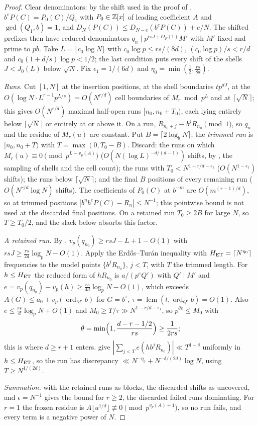 \documentclass[11pt]{article}
\newcommand{\fr}[1]{\{#1\}}
\DeclareMathOperator{\ord}{ord}
\DeclareMathOperator{\lcm}{lcm}
\begin{document}
\begin{proof}
Clear denominators: by the shift used in the proof of , $b^eP(C)=P_0(C)/Q_1$ with
$P_0\in\mathbb Z[x]$ of leading coefficient $A$ and $\gcd(Q_1,b)=1$, and $D_N(P(C))\le D_{N-e}(b^eP(C))+e/N$. The
shifted prefixes then have reduced denominators $q_n\mid p^{rsJ+O_P(1)}M'$ with $M'$ fixed and prime to $pb$.
Take $L=\lfloor c_0\log N\rfloor$ with $c_0\log p\le rs/(8d)$, $(c_0\log p)/s<r/d$ and
$c_0(1+d/s)\log p<1/2$; the last condition puts every shift of the shells $J<J_0(L)$ below $\sqrt N$. Fix
$\epsilon_1=1/(6d)$ and $\eta_0=\min(\frac12,\frac{rs}{8d})$.

\emph{Runs.} Cut $[1,N]$ at the insertion positions, at the shell boundaries $tp^{dJ}$, at the
$O(\log N\cdot L^{r-1}p^{L/s})=O(N^{r/d})$ cell boundaries of $M_r\bmod p^L$ and at $\lceil\sqrt N\rceil$; this
gives $O(N^{r/d})$ maximal half-open runs $[n_0,n_0+T_0)$, each lying entirely below $\lceil\sqrt N\rceil$ or
entirely at or above it. On a run, $R_{n_0+j}\equiv b^jR_{n_0}\pmod1$, so $q_n$ and the residue of $M_r(u)$ are
constant. Put $B=\lceil2\log_bN\rceil$; the \emph{trimmed run} is $[n_0,n_0+T)$ with $T=\max(0,T_0-B)$. Discard:
the runs on which $M_r(u)\equiv0\pmod{p^{L-v_p(A)}}$ ($O(N(\log L)^{-d/(d-1)})$ shifts, by ,
the sampling of shells and the cell count); the runs with $T_0<N^{1-r/d-\epsilon_1}$ ($O(N^{1-\epsilon_1})$
shifts); the runs below $\lceil\sqrt N\rceil$; and the final $B$ positions of every remaining run
($O(N^{r/d}\log N)$ shifts). The coefficients of $P_0(C)$ at $b^{-m}$ are $O(m^{(r-1)/d})$, so at trimmed
positions $|b^nb^eP(C)-R_n|\le N^{-1}$; this pointwise bound is not used at the discarded final positions. On a
retained run $T_0\ge2B$ for large $N$, so $T\ge T_0/2$, and the slack below absorbs this factor.

\emph{A retained run.} By , $v_p(q_{n_0})\ge rsJ-L+1-O(1)$ with
$rsJ\ge\frac{rs}{2d}\log_pN-O(1)$. Apply the Erd\H{o}s--Tur\'an inequality with $H_{\rm ET}=\lceil N^{\eta_0}\rceil$
frequencies to the model points $\fr{b^jR_{n_0}}$, $j<T$, with $T$ the trimmed length. For $h\le H_{\rm ET}$ the reduced form of $hR_{n_0}$
is $a/(p^eQ')$ with $Q'\mid M'$ and $e=v_p(q_{n_0})-v_p(h)\ge\frac{rs}{4d}\log_pN-O(1)$, which exceeds
$A(G)\le a_0+v_p(\ord_{M'}b)$ for $G=b^\tau$, $\tau=\lcm(t,\ord_{Q'}b)=O(1)$. Also
$e\le\frac{rs}d\log_pN+O(1)$ and $M_0\ge T/\tau\gg N^{1-r/d-\epsilon_1}$, so $p^{\theta e}\le M_0$ with
\[
\theta=\min\Bigl(1,\frac{d-r-1/2}{rs}\Bigr)\ge\frac1{2rs};
\]
this is where $d\ge r+1$ enters.  give
$|\sum_{j<T}e(hb^jR_{n_0})|\ll T^{1-\delta}$ uniformly in $h\le H_{\rm ET}$, so the run has discrepancy
$\ll N^{-\eta_0}+N^{-\delta/(2d)}\log N$, using $T\ge N^{1/(2d)}$.

\emph{Summation.}  with the retained runs as blocks, the discarded shifts as uncovered,
and $\epsilon=N^{-1}$ gives the bound for $r\ge2$, the discarded failed runs dominating. For $r=1$ the frozen
residue is $A\lfloor u^{1/d}\rfloor\not\equiv0\pmod{p^{v_p(A)+1}}$, so no run fails, and every term is a
negative power of $N$.
\end{proof}
\end{document}
